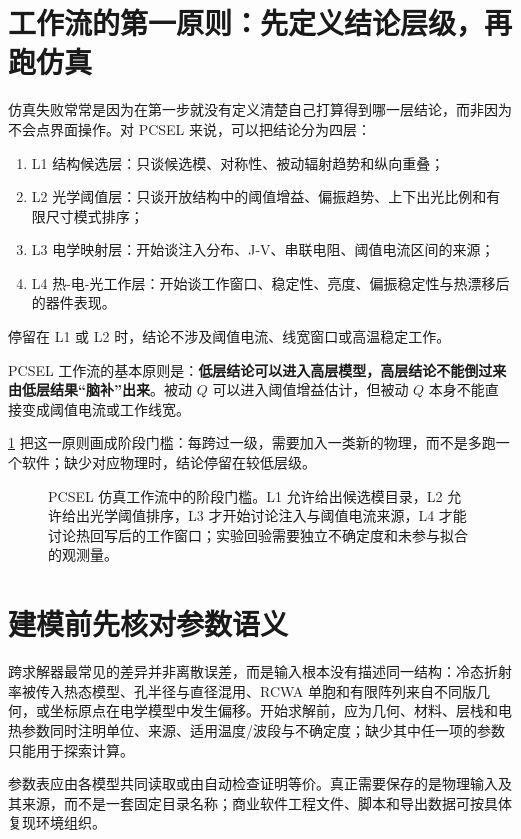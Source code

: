 \section{工作流的第一原则：先定义结论层级，再跑仿真}
仿真失败常常是因为在第一步就没有定义清楚自己打算得到哪一层结论，而非因为不会点界面操作。对 PCSEL 来说，可以把结论分为四层：
\begin{enumerate}
  \item L1 结构候选层：只谈候选模、对称性、被动辐射趋势和纵向重叠；
  \item L2 光学阈值层：只谈开放结构中的阈值增益、偏振趋势、上下出光比例和有限尺寸模式排序；
  \item L3 电学映射层：开始谈注入分布、J-V、串联电阻、阈值电流区间的来源；
  \item L4 热-电-光工作层：开始谈工作窗口、稳定性、亮度、偏振稳定性与热漂移后的器件表现。
\end{enumerate}
停留在 L1 或 L2 时，结论不涉及阈值电流、线宽窗口或高温稳定工作。

\begin{RigorousBox}
PCSEL 工作流的基本原则是：\textbf{低层结论可以进入高层模型，高层结论不能倒过来由低层结果“脑补”出来}。被动 $Q$ 可以进入阈值增益估计，但被动 $Q$ 本身不能直接变成阈值电流或工作线宽。
\end{RigorousBox}

\cref{fig:ch22_evidence_stage_gates} 把这一原则画成阶段门槛：每跨过一级，需要加入一类新的物理，而不是多跑一个软件；缺少对应物理时，结论停留在较低层级。

\begin{figure}[htbp]
  \centering
  
  \caption{PCSEL 仿真工作流中的阶段门槛。L1 允许给出候选模目录，L2 允许给出光学阈值排序，L3 才开始讨论注入与阈值电流来源，L4 才能讨论热回写后的工作窗口；实验回验需要独立不确定度和未参与拟合的观测量。}
  \label{fig:ch22_evidence_stage_gates}
\end{figure}

\section{建模前先核对参数语义}
跨求解器最常见的差异并非离散误差，而是输入根本没有描述同一结构：冷态折射率被传入热态模型、孔半径与直径混用、RCWA 单胞和有限阵列来自不同版几何，或坐标原点在电学模型中发生偏移。开始求解前，应为几何、材料、层栈和电热参数同时注明单位、来源、适用温度/波段与不确定度；缺少其中任一项的参数只能用于探索计算。

参数表应由各模型共同读取或由自动检查证明等价。真正需要保存的是物理输入及其来源，而不是一套固定目录名称；商业软件工程文件、脚本和导出数据可按具体复现环境组织。

